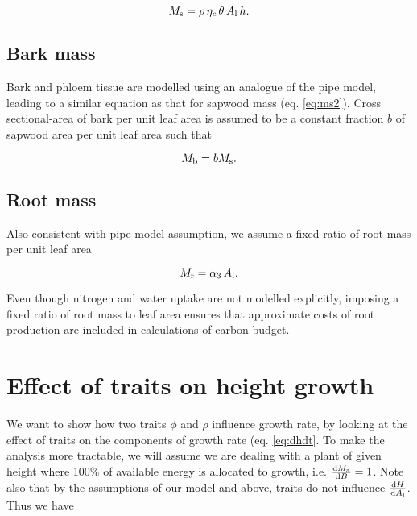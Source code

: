 \documentclass[12pt, a4paper]{article}
\begin{document}
\begin{appendices}
\begin{equation}\label{eq:ms2}
M_\textrm{s}=\rho \, \eta_c \, \theta \, A_{\rm l} \, h.
\end{equation}

\subsection{Bark mass}\label{bark-mass}

Bark and phloem tissue are modelled using an analogue of the pipe model,
leading to a similar equation as that for sapwood mass (eq.
\ref{eq:ms2}). Cross sectional-area of bark per unit leaf area is
assumed to be a constant fraction $b$ of sapwood area per unit leaf
area such that

\begin{equation}\label{eq:mb}
M_{\rm b}=b M_\textrm{s}.
\end{equation}

\subsection{Root mass}\label{root-mass}

Also consistent with pipe-model assumption, we assume a fixed ratio of
root mass per unit leaf area

\begin{equation}\label{eq:mr}
M_{\rm r}=\alpha_3 \, A_{\rm l}.
\end{equation}

Even though nitrogen and water uptake are not modelled explicitly,
imposing a fixed ratio of root mass to leaf area ensures that
approximate costs of root production are included in calculations of
carbon budget.

\section{Effect of traits on height growth} \label{app:traits_max}

We want to show how two traits $\phi$ and $\rho$ influence growth rate,
by looking at the effect of
traits on the components of growth rate (eq. \ref{eq:dhdt}. To make
the analysis more tractable, we will assume we are dealing with a plant of
given height where 100\% of available energy is allocated to growth,
i.e. $\frac{{\rm d}M_{\rm a}}{{\rm d}B}=1$. Note also
that by the assumptions of our model and above, traits do not influence
$\frac{{\rm d}H} {{\rm d}A_{\rm l}}$. Thus we have


\end{appendices}
\end{document}

